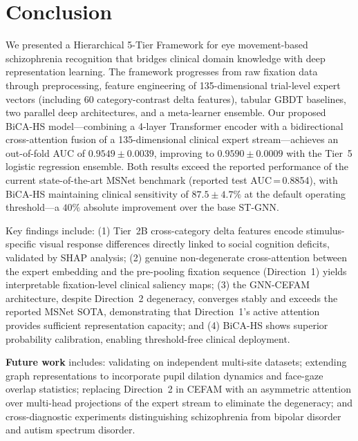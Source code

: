 \section{Conclusion}
\label{sec:conclusion}

We presented a Hierarchical 5-Tier Framework for eye movement-based schizophrenia recognition that bridges clinical domain knowledge with deep representation learning. The framework progresses from raw fixation data through preprocessing, feature engineering of 135-dimensional trial-level expert vectors (including 60 category-contrast delta features), tabular GBDT baselines, two parallel deep architectures, and a meta-learner ensemble. Our proposed BiCA-HS model---combining a 4-layer Transformer encoder with a bidirectional cross-attention fusion of a 135-dimensional clinical expert stream---achieves an out-of-fold AUC of $0.9549 \pm 0.0039$, improving to $0.9590 \pm 0.0009$ with the Tier~5 logistic regression ensemble. Both results exceed the reported performance of the current state-of-the-art MSNet benchmark (reported test AUC\,=\,0.8854), with BiCA-HS maintaining clinical sensitivity of $87.5 \pm 4.7\%$ at the default operating threshold---a $40\%$ absolute improvement over the base ST-GNN.

Key findings include: (1) Tier~2B cross-category delta features encode stimulus-specific visual response differences directly linked to social cognition deficits, validated by SHAP analysis; (2) genuine non-degenerate cross-attention between the expert embedding and the pre-pooling fixation sequence (Direction~1) yields interpretable fixation-level clinical saliency maps; (3) the GNN-CEFAM architecture, despite Direction~2 degeneracy, converges stably and exceeds the reported MSNet SOTA, demonstrating that Direction~1's active attention provides sufficient representation capacity; and (4) BiCA-HS shows superior probability calibration, enabling threshold-free clinical deployment.

\textbf{Future work} includes: validating on independent multi-site datasets; extending graph representations to incorporate pupil dilation dynamics and face-gaze overlap statistics; replacing Direction~2 in CEFAM with an asymmetric attention over multi-head projections of the expert stream to eliminate the degeneracy; and cross-diagnostic experiments distinguishing schizophrenia from bipolar disorder and autism spectrum disorder.
